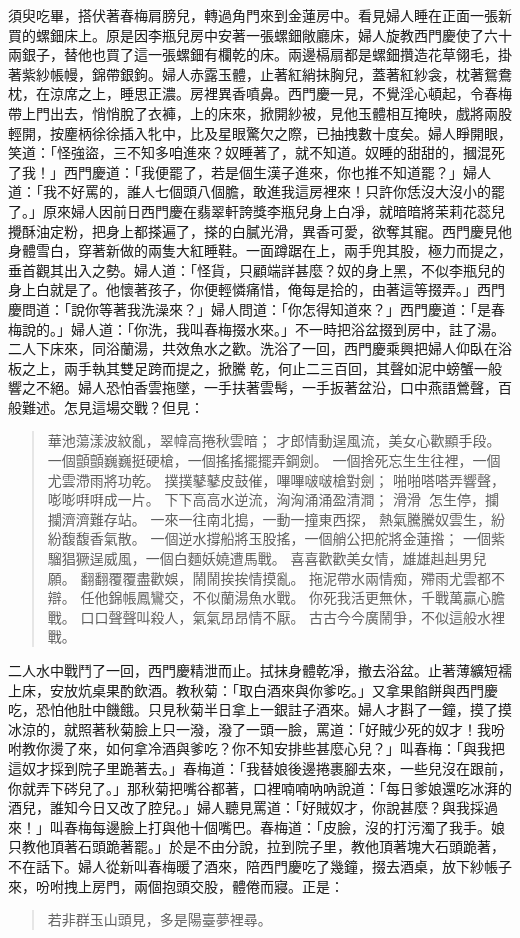 須臾吃畢，搭伏著春梅肩膀兒，轉過角門來到金蓮房中。看見婦人睡在正面一張新買的螺鈿床上。原是因李瓶兒房中安著一張螺鈿敞廳床，婦人旋教西門慶使了六十兩銀子，替他也買了這一張螺鈿有欄乾的床。兩邊槅扇都是螺鈿攢造花草翎毛，掛著紫紗帳幔，錦帶銀鉤。婦人赤露玉體，止著紅綃抹胸兒，蓋著紅紗衾，枕著鴛鴦枕，在涼席之上，睡思正濃。房裡異香噴鼻。西門慶一見，不覺淫心頓起，令春梅帶上門出去，悄悄脫了衣褲，上的床來，掀開紗被，見他玉體相互掩映，戲將兩股輕開，按麈柄徐徐插入牝中，比及星眼驚欠之際，已抽拽數十度矣。婦人睜開眼，笑道：「怪強盜，三不知多咱進來？奴睡著了，就不知道。奴睡的甜甜的，摑混死了我！」西門慶道：「我便罷了，若是個生漢子進來，你也推不知道罷？」婦人道：「我不好罵的，誰人七個頭八個膽，敢進我這房裡來！只許你恁沒大沒小的罷了。」原來婦人因前日西門慶在翡翠軒誇獎李瓶兒身上白凈，就暗暗將茉莉花蕊兒攪酥油定粉，把身上都搽遍了，搽的白膩光滑，異香可愛，欲奪其寵。西門慶見他身體雪白，穿著新做的兩隻大紅睡鞋。一面蹲踞在上，兩手兜其股，極力而提之，垂首觀其出入之勢。婦人道：「怪貨，只顧端詳甚麼？奴的身上黑，不似李瓶兒的身上白就是了。他懷著孩子，你便輕憐痛惜，俺每是拾的，由著這等掇弄。」西門慶問道：「說你等著我洗澡來？」婦人問道：「你怎得知道來？」西門慶道：「是春梅說的。」婦人道：「你洗，我叫春梅掇水來。」不一時把浴盆掇到房中，註了湯。二人下床來，同浴蘭湯，共效魚水之歡。洗浴了一回，西門慶乘興把婦人仰臥在浴板之上，兩手執其雙足跨而提之，掀騰𢵞乾，何止二三百回，其聲如泥中螃蟹一般響之不絕。婦人恐怕香雲拖墜，一手扶著雲髩，一手扳著盆沿，口中燕語鶯聲，百般難述。怎見這場交戰？但見：
\begin{quote}
華池蕩漾波紋亂，翠幃高捲秋雲暗；
才郎情動逞風流，美女心歡顯手段。
一個顫顫巍巍挺硬槍，一個搖搖擺擺弄鋼劍。
一個捨死忘生生往裡，一個尤雲滯雨將功乾。
撲撲鼕鼕皮鼓催，嗶嗶啵啵槍對劍；
啪啪嗒嗒弄響聲，嘭嘭㗑㗑成一片。
下下高高水逆流，洶洶涌涌盈清澗；
滑滑𣺥𣺥怎生停，攔攔濟濟難存站。
一來一往南北搗，一動一撞東西探，
熱氣騰騰奴雲生，紛紛馥馥香氣散。
一個逆水撐船將玉股搖，一個艄公把舵將金蓮揝；
一個紫騮猖獗逞威風，一個白麵妖嬈遭馬戰。
喜喜歡歡美女情，雄雄赳赳男兒願。
翻翻覆覆盡歡娛，鬧鬧挨挨情摸亂。
拖泥帶水兩情痴，殢雨尤雲都不辯。
任他錦帳鳳鸞交，不似蘭湯魚水戰。
你死我活更無休，千戰萬贏心膽戰。
口口聲聲叫殺人，氣氣昂昂情不厭。
古古今今廣鬧爭，不似這般水裡戰。
\end{quote}

二人水中戰鬥了一回，西門慶精泄而止。拭抹身體乾凈，撤去浴盆。止著薄纊短襦上床，安放炕桌果酌飲酒。教秋菊：「取白酒來與你爹吃。」又拿果餡餅與西門慶吃，恐怕他肚中饑餓。只見秋菊半日拿上一銀註子酒來。婦人才斟了一鐘，摸了摸冰涼的，就照著秋菊臉上只一潑，潑了一頭一臉，罵道：「好賊少死的奴才！我吩咐教你燙了來，如何拿冷酒與爹吃？你不知安排些甚麼心兒？」叫春梅：「與我把這奴才採到院子里跪著去。」春梅道：「我替娘後邊捲裹腳去來，一些兒沒在跟前，你就弄下硶兒了。」那秋菊把嘴谷都著，口裡喃喃吶吶說道：「每日爹娘還吃冰湃的酒兒，誰知今日又改了腔兒。」婦人聽見罵道：「好賊奴才，你說甚麼？與我採過來！」叫春梅每邊臉上打與他十個嘴巴。春梅道：「皮臉，沒的打污濁了我手。娘只教他頂著石頭跪著罷。」於是不由分說，拉到院子里，教他頂著塊大石頭跪著，不在話下。婦人從新叫春梅暖了酒來，陪西門慶吃了幾鐘，掇去酒桌，放下紗帳子來，吩咐拽上房門，兩個抱頭交股，體倦而寢。正是：
\begin{quote}
若非群玉山頭見，多是陽臺夢裡尋。
\end{quote}
